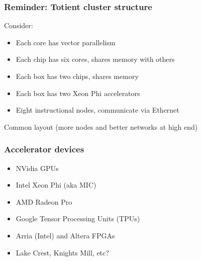 \documentclass{beamer}
\begin{document}
\begin{frame}
  \titlepage
\end{frame}


\begin{frame}
  \frametitle{Reminder: Totient cluster structure}

  Consider:
  \begin{itemize}
  \item Each core has vector parallelism
  \item Each chip has six cores, shares memory with others
  \item Each box has two chips, shares memory
  \item Each box has two \alert{Xeon Phi accelerators}
  \item Eight instructional nodes, communicate via Ethernet
  \end{itemize}
  Common layout (more nodes and better networks at high end)

\end{frame}


\begin{frame}
  \frametitle{Accelerator devices}

  \begin{itemize}
  \item NVidia GPUs
  \item Intel Xeon Phi (aka MIC)
  \item AMD Radeon Pro
  \item Google Tensor Processing Units (TPUs)
  \item Arria (Intel) and Altera FPGAs
  \item Lake Crest, Knights Mill, etc?
  \end{itemize}
\end{frame}
\end{document}
